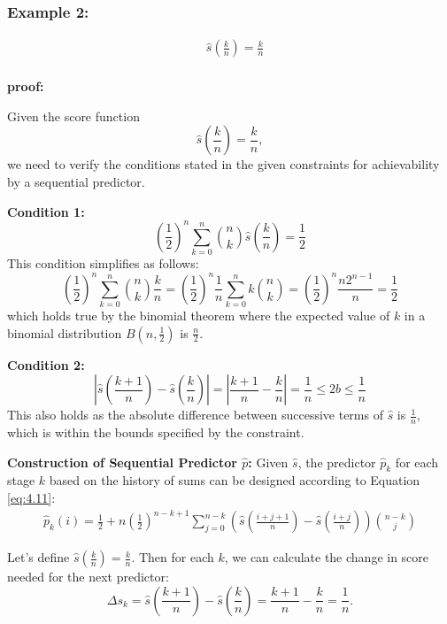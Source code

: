 \documentclass[11pt]{article}
\numberwithin{equation}{section}
\theoremstyle{boldStyle}
\begin{document}
\bigbreak

\subsubsection{Example 2:}

\begin{align*}
    &\hat{s} \left( \frac{k}{n} \right)= \frac{k}{n} \\
\end{align*}

\textbf{proof:}

Given the score function 
\[
\hat{s}\left(\frac{k}{n}\right) = \frac{k}{n},
\]
we need to verify the conditions stated in the given constraints for achievability by a sequential predictor.


\textbf{Condition 1:}
\[
\left(\frac{1}{2}\right)^n \sum_{k=0}^n \binom{n}{k} \hat{s} \left(\frac{k}{n}\right) = \frac{1}{2}
\]
This condition simplifies as follows:
\[
\left(\frac{1}{2}\right)^n \sum_{k=0}^n \binom{n}{k} \frac{k}{n} = \left(\frac{1}{2}\right)^n \frac{1}{n} \sum_{k=0}^n k \binom{n}{k} = \left(\frac{1}{2}\right)^n \frac{n 2^{n-1}}{n} = \frac{1}{2}
\]
which holds true by the binomial theorem where the expected value of $k$ in a binomial distribution $B(n, \frac{1}{2})$ is $\frac{n}{2}$.

\textbf{Condition 2:}
\[
\left| \hat{s} \left(\frac{k+1}{n}\right) - \hat{s} \left(\frac{k}{n}\right) \right| = \left| \frac{k+1}{n} - \frac{k}{n} \right| = \frac{1}{n} \leq 2b \leq \frac{1}{n}
\]
This also holds as the absolute difference between successive terms of $\hat{s}$ is $\frac{1}{n}$, which is within the bounds specified by the constraint.

\bigbreak

\textbf{Construction of Sequential Predictor $\hat{p}$:}
Given $\hat{s}$, the predictor $\hat{p}_k$ for each stage $k$ based on the history of sums can be designed according 
to Equation \ref{eq:4.11}:
\begin{align*}
    \hat{p}_k(i) = \frac{1}{2} + n \left(\frac{1}{2}\right)^{n-k+1} 
    \sum_{j=0}^{n-k} \left(\hat{s} \left( \frac{i+j+1}{n} \right) - \hat{s} \left( \frac{i+j}{n} \right) \right) \binom{n-k}{j}
\end{align*}

Let's define $\hat{s}\left(\frac{k}{n}\right) = \frac{k}{n}$. Then for each $k$, we can calculate the change in score needed for the next predictor:
\[
\Delta s_k = \hat{s}\left(\frac{k+1}{n}\right) - \hat{s}\left(\frac{k}{n}\right) = \frac{k+1}{n} - \frac{k}{n} = \frac{1}{n}.
\]
\end{document}
